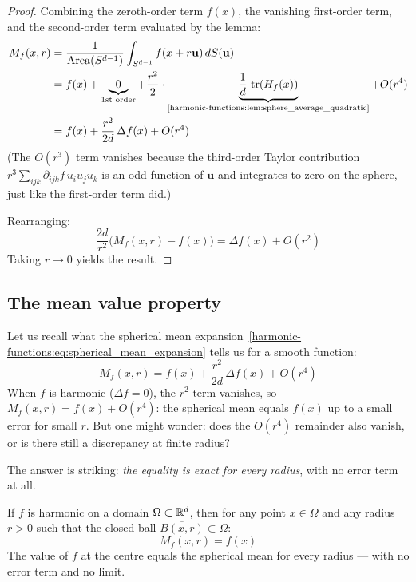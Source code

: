 \begin{notechapter}
\begin{proof}
Combining the zeroth-order term $f(x)$, the vanishing first-order term, and
the second-order term evaluated by the lemma:
\begin{align}
M_f(x,r)
&= \frac{1}{\Area(S^{d-1})} \int_{S^{d-1}}
   f(x + r\mathbf{u})\,dS(\mathbf{u}) \\
&= f(x) + \underbrace{0}_{\text{1st order}}
   + \frac{r^2}{2}\cdot
   \underbrace{\frac{1}{d}\,\tr(H_f(x))}_{\text{\cref{harmonic-functions:lem:sphere_average_quadratic}}}
   + O(r^4) \\
&= f(x) + \frac{r^2}{2d}\,\Delta f(x) + O(r^4)
\end{align}
(The $O(r^3)$ term vanishes because the third-order Taylor contribution
$r^3 \sum_{ijk} \partial_{ijk}f\, u_i u_j u_k$ is an odd function of
$\mathbf{u}$ and integrates to zero on the sphere, just like the first-order
term did.)

Rearranging:
\[
\frac{2d}{r^2}\bigl(M_f(x,r) - f(x)\bigr)
= \Delta f(x) + O(r^2)
\]
Taking $r \to 0$ yields the result.
\end{proof}

\subsection{The mean value property}

Let us recall what the spherical mean expansion~\eqref{harmonic-functions:eq:spherical_mean_expansion} tells us for a smooth function:
\[
M_f(x,r) = f(x) + \frac{r^2}{2d}\,\Delta f(x) + O(r^4)
\]
When $f$ is harmonic ($\Delta f = 0$), the $r^2$ term vanishes, so
$M_f(x,r) = f(x) + O(r^4)$: the spherical mean equals $f(x)$ up to a
small error for small $r$. But one might wonder: does the $O(r^4)$
remainder also vanish, or is there still a discrepancy at finite radius?

The answer is striking: \emph{the equality is exact for every radius}, with
no error term at all.

\begin{theorem}
\label{harmonic-functions:thm:mean_value}
If $f$ is harmonic on a domain $\Omega \subset \mathbb{R}^d$, then for any point
$x \in \Omega$ and any radius $r > 0$ such that the closed ball
$\overline{B(x,r)} \subset \Omega$:
\begin{equation}
M_f(x,r) = f(x)
\end{equation}
The value of $f$ at the centre equals the spherical mean for every
radius --- with no error term and no limit.
\end{theorem}


\end{notechapter}
